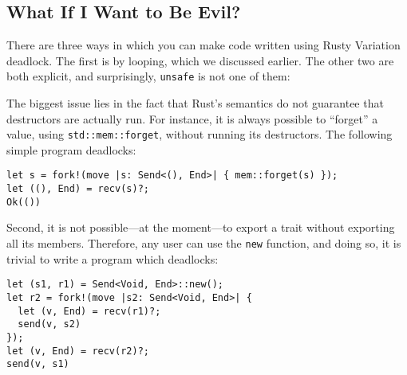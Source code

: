 \documentclass[sigconf,natbib=false]{acmart}
\begin{document}
\subsection*{What If I Want to Be Evil?}\label{sec:limitations}
There are three ways in which you can make code written using Rusty Variation deadlock. The first is by looping, which we discussed earlier. The other two are both explicit, and surprisingly, \lstinline{unsafe} is not one of them:

The biggest issue lies in the fact that Rust's semantics do not guarantee that destructors are actually run. For instance, it is always possible to ``forget'' a value, using \lstinline{std::mem::forget}, without running its destructors. The following simple program deadlocks:
\begin{lstlisting}
let s = fork!(move |s: Send<(), End>| { mem::forget(s) });
let ((), End) = recv(s)?;
Ok(())
\end{lstlisting}

Second, it is not possible---at the moment---to export a trait without exporting all its members. Therefore, any user can use the \lstinline{new} function, and doing so, it is trivial to write a program which deadlocks: 
\begin{lstlisting}
let (s1, r1) = Send<Void, End>::new();
let r2 = fork!(move |s2: Send<Void, End>| {
  let (v, End) = recv(r1)?;
  send(v, s2)
});
let (v, End) = recv(r2)?;
send(v, s1)
\end{lstlisting}

\clearpage
\printbibliography
\end{document}
